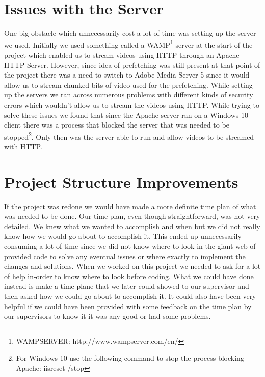 \section{Issues with the Server}
\label{sec:serverissues}

One big obstacle which unnecessarily cost a lot of time was setting up the server we used. Initially we used something called a WAMP\footnote{WAMPSERVER: http://www.wampserver.com/en/} server at the start of the project which enabled us to stream videos using HTTP through an Apache HTTP Server. However, since idea of prefetching was still present at that point of the project there was a need to switch to Adobe Media Server 5 since it would allow us to stream chunked bits of video used for the prefetching. While setting up the servers we ran across numerous problems with different kinds of security errors which wouldn’t allow us to stream the videos using HTTP. While trying to solve these issues we found that since the Apache server ran on a Windows 10 client there was a process that blocked the server that was needed to be stopped\footnote{For Windows 10 use the following command to stop the process blocking Apache: iisreset /stop}. Only then was the server able to run and allow videos to be streamed with HTTP.

\section{Project Structure Improvements}
\label{sec:psi}

If the project was redone we would have made a more definite time plan of what was needed to be done. Our time plan, even though straightforward, was not very detailed. We knew what we wanted to accomplish and when but we did not really know how we would go about to accomplish it. This ended up unnecessarily consuming a lot of time since we did not know where to look in the giant web of provided code to solve any eventual issues or where exactly to implement the changes and solutions. When we worked on this project we needed to ask for a lot of help in-order to know where to look before coding. What we could have done instead is make a time plane that we later could showed to our supervisor and then asked how we could go about to accomplish it. It could also have been very helpful if we could have been provided with some feedback on the time plan by our supervisors to know it it was any good or had some problems. 

